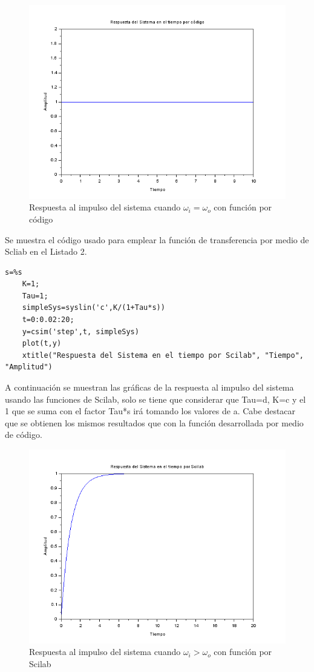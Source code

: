 \documentclass{article}
\begin{document}
	    \begin{figure}[H]
	  	\centering
	  	\includegraphics[scale=0.55]{igual.PNG}
	  	\centering
	  	\caption{Respuesta al impulso del sistema cuando $ \omega_i = \omega_o $ con función por código}
	  \end{figure}
	
	Se muestra el código usado para emplear la función de transferencia por medio de Scliab en el Listado 2.
	\begin{lstlisting}[frame=single]
	s=%s 
	K=1;
	Tau=1;
	simpleSys=syslin('c',K/(1+Tau*s))
	t=0:0.02:20;
	y=csim('step',t, simpleSys)
	plot(t,y)
	xtitle("Respuesta del Sistema en el tiempo por Scilab", "Tiempo", "Amplitud")
	\end{lstlisting}
	
	A continuación se muestran las gráficas de la respuesta al impulso del sistema usando las funciones de Scilab, solo se tiene que considerar que Tau=d, K=c y el 1 que se suma con el factor Tau*s irá tomando los valores de a. Cabe destacar que se obtienen los mismos resultados que con la función desarrollada por medio de código.
	
	
	\begin{figure}[H]
		\centering
		\includegraphics[scale=0.55]{mayor1.PNG}
		\centering
		\caption{Respuesta al impulso del sistema cuando $ \omega_i > \omega_o $ con función por Scilab}
	\end{figure}
	
\end{document}

